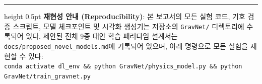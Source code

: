 \documentclass[11pt,a4paper]{article}
\begin{document}
\bigskip
\hrule height 0.5pt
\vspace{6pt}
{\footnotesize\sffamily\textcolor{MutedText}{
\textbf{재현성 안내 (Reproducibility)}: 본 보고서의 모든 실험 코드, 기호 검증 스크립트, 모델 체크포인트 및 시각화 생성기는 저장소의 \texttt{GravNet/} 디렉토리에 수록되어 있다. 제안된 전체 9종 대안 학습 패러다임 설계서는 \texttt{docs/proposed\_novel\_models.md}에 기록되어 있으며, 아래 명령으로 모든 실험을 재현할 수 있다:\\[2pt]
\texttt{conda activate dl\_env \&\& python GravNet/physics\_model.py \&\& python GravNet/train\_gravnet.py}
}}
\end{document}
